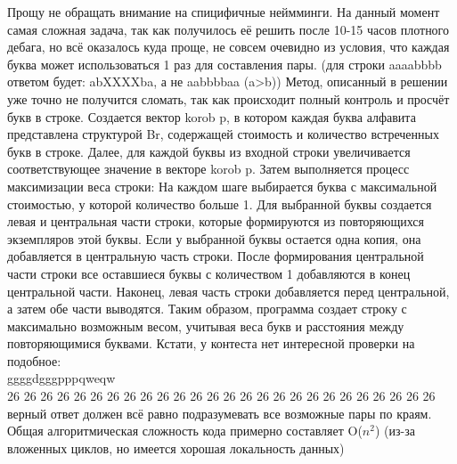 \documentclass{article}
\begin{document}
Прощу не обращать внимание на спицифичные неймминги. На данный момент самая сложная задача, так как получилось её решить после 10-15 часов плотного дебага, но всё оказалось куда проще, не совсем очевидно из условия, что каждая буква может использоваться 1 раз для составления пары. (для строки aaaabbbb ответом будет: abXXXXba, а не aabbbbaa (a>b))
Метод, описанный в решении уже точно не получится сломать, так как происходит полный контроль и просчёт букв в строке.
Создается вектор korob p, в котором каждая буква алфавита представлена структурой Br, содержащей стоимость и количество встреченных букв в строке.
Далее, для каждой буквы из входной строки увеличивается соответствующее значение в векторе korob p.
Затем выполняется процесс максимизации веса строки:
На каждом шаге выбирается буква с максимальной стоимостью, у которой количество больше 1.
Для выбранной буквы создается левая и центральная части строки, которые формируются из повторяющихся экземпляров этой буквы.
Если у выбранной буквы остается одна копия, она добавляется в центральную часть строки.
После формирования центральной части строки все оставшиеся буквы с количеством 1 добавляются в конец центральной части.
Наконец, левая часть строки добавляется перед центральной, а затем обе части выводятся.
Таким образом, программа создает строку с максимально возможным весом, учитывая веса букв и расстояния между повторяющимися буквами.
Кстати, у контеста нет интересной проверки на подобное:
\\
ggggdgggpppqweqw\\
26 26 26 26 26 26 26 26 26 26 26 26 26 26 26 26 26 26 26 26 26 26 26 26 26 26\\
верный ответ должен всё равно подразумевать все возможные пары по краям.\\
Общая алгоритмическая сложность кода примерно составляет O($n^2$) (из-за вложенных циклов, но имеется хорошая локальность данных)
\end{document}
